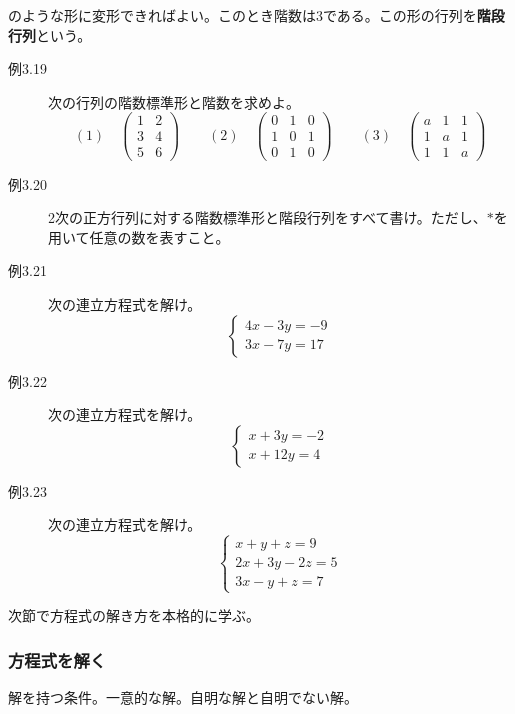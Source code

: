 \documentclass[10pt]{jsarticle}
\theoremstyle{definition}%
\numberwithin{equation}{section}%
\begin{document}
のような形に変形できればよい。このとき階数は3である。この形の行列を{\bf 階段行列}という。
\begin{description}
  \item[例3.19] 次の行列の階数標準形と階数を求めよ。
  \begin{equation}
    (1) \quad \begin{pmatrix}
      1 & 2 \\
      3 & 4 \\
      5 & 6
    \end{pmatrix} \quad \quad (2)\quad \begin{pmatrix}
      0 & 1 & 0 \\
      1 & 0 & 1 \\
      0 & 1 & 0
    \end{pmatrix}\quad \quad (3)\quad \begin{pmatrix}
      a & 1 & 1 \\
      1 & a & 1 \\
      1 & 1 & a
    \end{pmatrix}
  \end{equation}
  \item[例3.20] 2次の正方行列に対する階数標準形と階段行列をすべて書け。ただし、$*$を用いて任意の数を表すこと。
  \item[例3.21] 次の連立方程式を解け。
  \begin{equation}
  \begin{cases}
    4x-3y=-9\\
    3x-7y=17
  \end{cases}
  \end{equation}
  \item[例3.22] 次の連立方程式を解け。
  \begin{equation}
  \begin{cases}
    x+3y=-2\\
    x+12y=4
  \end{cases}
  \end{equation}
  \item[例3.23] 次の連立方程式を解け。
  \begin{equation}
  \begin{cases}
    x+y+z=9\\
    2x+3y-2z=5\\
    3x-y+z=7
  \end{cases}
  \end{equation}
\end{description}
次節で方程式の解き方を本格的に学ぶ。
\subsubsection{方程式を解く}
解を持つ条件。一意的な解。自明な解と自明でない解。
\end{document}

